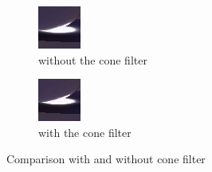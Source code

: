 \begin{figure}[h]

\centering
\begin{subfigure}[b]{0.4\textwidth}
	\includegraphics[width=\textwidth]{./images/renders/no-filter.png}
	\caption{without the cone filter}
\end{subfigure}
\begin{subfigure}[b]{0.4\textwidth}
	\includegraphics[width=\textwidth]{./images/renders/filter.png}
	\caption{with the cone filter}
\end{subfigure}
\caption{Comparison with and without cone filter}

\end{figure}
